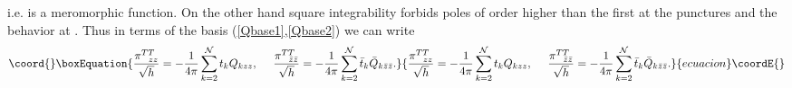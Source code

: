 \documentclass[a4paper,12pt]{article}
\begin{document}
i.e. \coordHE{} is a
meromorphic function. On the other hand square integrability forbids
poles of order higher than the first at the punctures \coordHE{} and the
behavior \coordHE{} at \myHighlight{$\infty$}\coordHE{}. Thus in terms of the basis
(\ref{Qbase1},\ref{Qbase2}) 
we can write 
\begin{equation}\coord{}\boxEquation{
\frac{\pi^{TT}_{~~zz}}{\sqrt h} = -\frac{1}{4\pi}\sum_{k=2}^{\cal N} t_k
Q_{kzz},~~~~\frac{\pi^{TT}_{~~\bar z\bar z}}{\sqrt h} =
-\frac{1}{4\pi}\sum_{k=2}^{\cal N} \bar t_k \bar Q_{k\bar z\bar z}. 
}{
\frac{\pi^{TT}_{~~zz}}{\sqrt h} = -\frac{1}{4\pi}\sum_{k=2}^{\cal N} t_k
Q_{kzz},~~~~\frac{\pi^{TT}_{~~\bar z\bar z}}{\sqrt h} =
-\frac{1}{4\pi}\sum_{k=2}^{\cal N} \bar t_k \bar Q_{k\bar z\bar z}. 
}{ecuacion}\coordE{}\end{equation}
\end{document}
